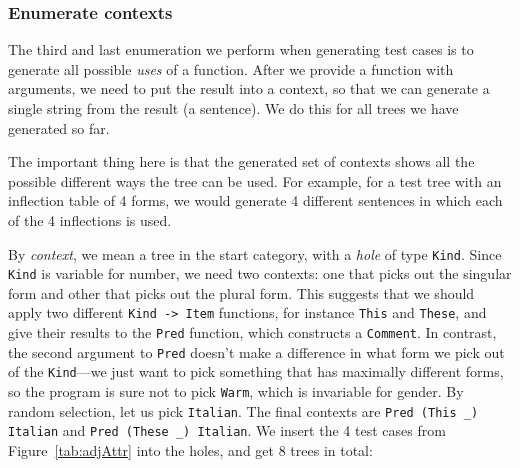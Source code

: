 \documentclass[runningheads]{llncs}
\def\t#1{\texttt{#1}}
\begin{document}
\subsubsection{Enumerate contexts} The third and last enumeration we perform when generating test cases is to generate all possible \emph{uses} of a function. After we provide a function with arguments, we need to put the result into a context, so that we can generate a single string from the result (a sentence). We do this for all trees we have generated so far.

The important thing here is that the generated set of contexts shows
all the possible different ways the tree can be used. For example, for
a test tree with an inflection table of 4 forms, we would generate 4 different sentences in which each of the 4 inflections is used.

By \emph{context}, we mean a tree in the start category, with a
\emph{hole} of type \t{Kind}. Since \t{Kind} is variable for
number, we need two contexts:
one that picks out the singular form and other that picks out
the plural form. This suggests that we should apply two different
\t{Kind -> Item} functions, for instance \t{This} and \t{These}, and
give their results to the \t{Pred} function, which constructs a \t{Comment}.
In contrast, the second argument to \t{Pred} doesn't make a difference
in what form we pick out of the \t{Kind}---we just want to pick
something that has maximally different forms, so the program is sure
not to pick \t{Warm}, which is invariable for gender. By random
selection, let us pick \t{Italian}.
The final contexts are \verb|Pred (This _) Italian| and \verb|Pred (These _) Italian|.
We insert the 4 test cases from Figure~\ref{tab:adjAttr} into the
holes, and get 8 trees in total: 
\end{document}
